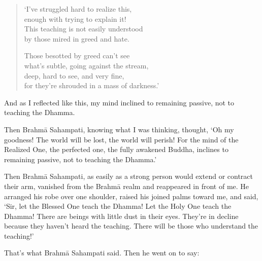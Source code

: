 \documentclass[12pt,openany]{book}%
\begin{document}
\begin{verse}%
‘I’ve struggled hard to realize this, \\
enough with trying to explain it! \\
This teaching is not easily understood \\
by those mired in greed and hate. 

Those besotted by greed can’t see \\
what’s subtle, going against the stream, \\
deep, hard to see, and very fine, \\
for they’re shrouded in a mass of darkness.’ 

%
\end{verse}

And as I reflected like this, my mind inclined to remaining passive, not to teaching the Dhamma. 

Then \textsanskrit{Brahmā} Sahampati, knowing what I was thinking, thought, ‘Oh my goodness! The world will be lost, the world will perish! For the mind of the Realized One, the perfected one, the fully awakened Buddha, inclines to remaining passive, not to teaching the Dhamma.’ 

Then \textsanskrit{Brahmā} Sahampati, as easily as a strong person would extend or contract their arm, vanished from the \textsanskrit{Brahmā} realm and reappeared in front of me. He arranged his robe over one shoulder, raised his joined palms toward me, and said, ‘Sir, let the Blessed One teach the Dhamma! Let the Holy One teach the Dhamma! There are beings with little dust in their eyes. They’re in decline because they haven’t heard the teaching. There will be those who understand the teaching!’ 

That’s what \textsanskrit{Brahmā} Sahampati said. Then he went on to say: 
\end{document}
